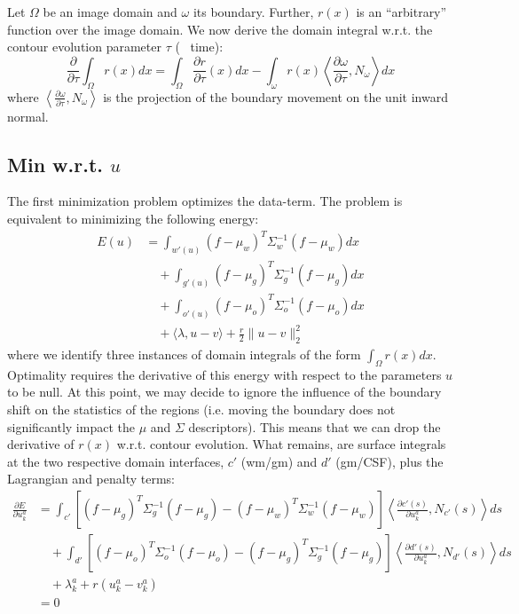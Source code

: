 Let $\Omega$ be an image domain and $\omega$ its boundary. Further, $r(x)$ is an ``arbitrary'' function over the image domain. We now derive the domain integral w.r.t. the contour evolution parameter $\tau$ (~ time):
\begin{equation}
\frac{\partial}{\partial \tau} \int_\Omega r(x) dx = \int_\Omega \frac{\partial r}{\partial \tau}(x) dx - \int_\omega r(x) \left\langle \frac{\partial\omega}{\partial\tau}, N_\omega\right\rangle dx
\end{equation}
where $\left\langle\frac{\partial\omega}{\partial\tau}, N_\omega\right\rangle$ is the projection of the boundary movement on the unit inward normal.


\subsection{Min w.r.t. $u$}
The first minimization problem optimizes the data-term. The problem is equivalent to minimizing the following energy:
\begin{align}
E(u) &= \int_{w'(u)} (f-\mu_w)^T\Sigma_w^{-1}(f-\mu_w) dx\nonumber\\
&\quad +\int_{g'(u)} (f-\mu_g)^T\Sigma_g^{-1}(f-\mu_g) dx\\
&\quad +\int_{o'(u)} (f-\mu_o)^T\Sigma_o^{-1}(f-\mu_o) dx\nonumber\\
&\quad + \langle \lambda, u-v \rangle + \frac{r}{2} \| u - v \|_2^2\nonumber
\end{align}
where we identify three instances of domain integrals of the form $\int_\Omega r(x) dx$. Optimality requires the derivative of this energy with respect to the parameters $u$ to be null. At this point, we may decide to ignore the influence of the boundary shift on the statistics of the regions (i.e. moving the boundary does not significantly impact the $\mu$ and $\Sigma$ descriptors). This means that we can drop the derivative of $r(x)$ w.r.t. contour evolution. What remains, are surface integrals at the two respective domain interfaces, $c'$ (wm/gm) and $d'$ (gm/CSF), plus the Lagrangian and penalty terms:
\begin{align}
\frac{\partial E}{\partial u_k^a} &= \int_{c'} \left[(f-\mu_g)^T\Sigma_g^{-1}(f-\mu_g) - (f-\mu_w)^T\Sigma_w^{-1}(f-\mu_w)\right]\left\langle\frac{\partial c'(s)}{\partial u_k^a}, N_{c'}(s)\right\rangle ds \nonumber\\
&\quad + \int_{d'} \left[(f-\mu_o)^T\Sigma_o^{-1}(f-\mu_o) - (f-\mu_g)^T\Sigma_g^{-1}(f-\mu_g)\right]\left\langle\frac{\partial d'(s)}{\partial u_k^a}, N_{d'}(s)\right\rangle ds \\
&\quad + \lambda_k^a + r(u_k^a - v_k^a)\nonumber\\
& = 0\nonumber
\end{align}
